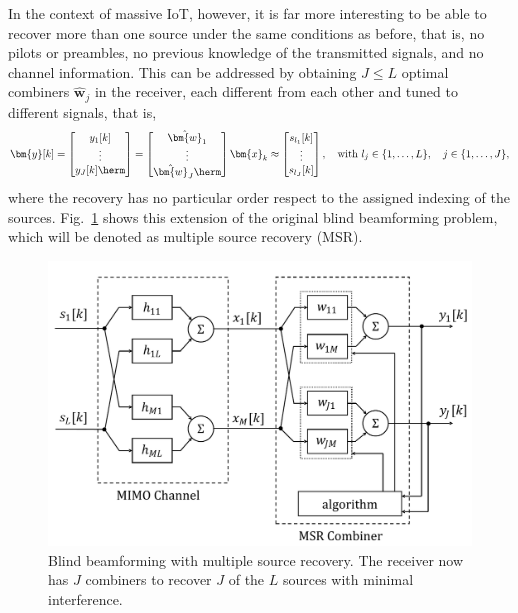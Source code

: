 In the context of massive IoT, however, it is far more interesting to be able to recover more than one source under the same conditions as before, that is, no pilots or preambles, no previous knowledge of the transmitted signals, and no channel information. 
This can be addressed by obtaining $J\leq L$ optimal combiners $\hat{\bm{w}}_j$ in the receiver, each different from each other and tuned to different signals, that is,
\begin{equation}
\bm{y}[k]=\begin{bmatrix}
y_1[k]\\
\vdots\\
y_J[k]\herm\\
\end{bmatrix}=\begin{bmatrix}
\hat{\bm{w}}_1\\
\vdots\\
\hat{\bm{w}}_J\herm\\
\end{bmatrix}
\bm{x}_k\approx
\begin{bmatrix}
{s}_{l_1}[k]\\
\vdots\\
{s}_{l_J}[k]\end{bmatrix},\quad\text{with}\,\,
l_j\in\{1,\ldots,L\},\quad j\in\{1,\ldots,J\},
\end{equation}
where the recovery has no particular order respect to the assigned indexing of the sources. Fig.~\ref{fig:beamformingMSR} shows this extension of the original blind beamforming problem, which will be denoted as multiple source recovery (MSR).
\begin{figure}
	\centering
	\includegraphics[width=0.9\linewidth]{./figs/msr_beamforming2.pdf}
	\caption{Blind beamforming with multiple source recovery. The receiver now has $J$ combiners to recover $J$ of the $L$ sources with minimal interference.} \label{fig:beamformingMSR}
\end{figure}


